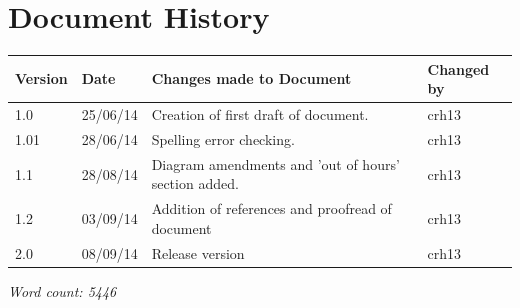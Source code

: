 \documentclass[12pt]{article}
\begin{document}

\section{Document History}

\begin{tabular}{|l | l | p{3.2in} | l |}

\hline

Version & Date & Changes made to Document & Changed by \\

\hline

1.0 & 25/06/14 & Creation of first draft of document. & crh13\\

\hline

1.01 & 28/06/14 & Spelling error checking. & crh13\\

\hline

1.1 & 28/08/14 & Diagram amendments and 'out of hours' section added. & crh13\\

\hline

1.2 & 03/09/14 & Addition of references and proofread of document & crh13\\

\hline

2.0 & 08/09/14 & Release version & crh13\\

\hline

\end{tabular}

\vspace{6cm}

\begin{center}
\emph{Word count: 5446}
\end{center}


\end{document}
